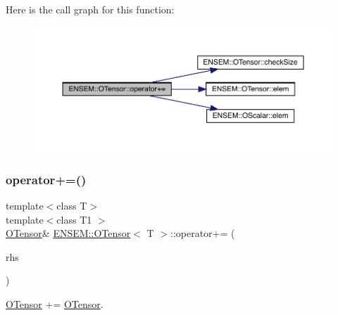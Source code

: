 Here is the call graph for this function\+:
\nopagebreak
\begin{figure}[H]
\begin{center}
\leavevmode
\includegraphics[width=350pt]{da/d8a/classENSEM_1_1OTensor_a93fe0d4638104ad0f6bdaf5de7760276_cgraph}
\end{center}
\end{figure}
\mbox{\label{classENSEM_1_1OTensor_a621ebf0d6d94eb56c1e3b31cb8c933b1}} 
\subsubsection{\texorpdfstring{operator+=()}{operator+=()}\hspace{0.1cm}{\footnotesize\ttfamily [3/4]}}
{\footnotesize\ttfamily template$<$class T$>$ \\
template$<$class T1 $>$ \\
\mbox{\hyperlink{classENSEM_1_1OTensor}{O\+Tensor}}\& \mbox{\hyperlink{classENSEM_1_1OTensor}{E\+N\+S\+E\+M\+::\+O\+Tensor}}$<$ T $>$\+::operator+= (\begin{DoxyParamCaption}\item[{const \mbox{\hyperlink{classENSEM_1_1OTensor}{O\+Tensor}}$<$ T1 $>$ \&}]{rhs }\end{DoxyParamCaption})\hspace{0.3cm}{\ttfamily [inline]}}



\mbox{\hyperlink{classENSEM_1_1OTensor}{O\+Tensor}} += \mbox{\hyperlink{classENSEM_1_1OTensor}{O\+Tensor}}. 

